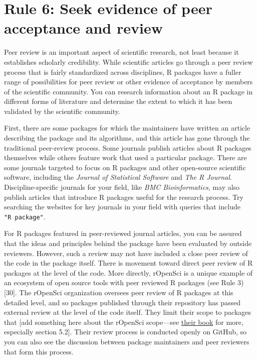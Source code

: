 \documentclass[10pt,letterpaper]{article}
\begin{document}
\hypertarget{rule-6-seek-evidence-of-peer-acceptance-and-review}{%
\section{Rule 6: Seek evidence of peer acceptance and
review}\label{rule-6-seek-evidence-of-peer-acceptance-and-review}}

Peer review is an important aspect of scientific research, not least
because it establishes scholarly credibility. While scientific articles
go through a peer review process that is fairly standardized across
disciplines, R packages have a fuller range of possibilities for peer
review or other evidence of acceptance by members of the scientific
community. You can research information about an R package in different
forms of literature and determine the extent to which it has been
validated by the scientific community.

First, there are some packages for which the maintainers have written an
article describing the package and its algorithms, and this article has
gone through the traditional peer-review process. Some journals publish
articles about R packages themselves while others feature work that used
a particular package. There are some journals targeted to focus on R
packages and other open-source scientific software, including the
\emph{Journal of Statistical Software} and \emph{The R Journal}.
Discipline-specific journals for your field, like \emph{BMC
Bioinformatics}, may also publish articles that introduce R packages
useful for the research process. Try searching the websites for key
journals in your field with queries that include \texttt{"R\ package"}.

For R packages featured in peer-reviewed journal articles, you can be
assured that the ideas and principles behind the package have been
evaluated by outside reviewers. However, such a review may not have
included a close peer review of the code in the package itself. There is
movement toward direct peer review of R packages at the level of the
code. More directly, rOpenSci is a unique example of an ecosystem of
open source tools with peer reviewed R packages (see Rule 3) {[}30{]}.
The rOpenSci organization oversees peer review of R packages at this
detailed level, and so packages published through their repository has
passed external review at the level of the code itself. They limit their
scope to packages that {[}add something here about the rOpenSci
scope---see \href{https://devguide.ropensci.org/}{their book} for more,
especially section 5.2{]}. Their review process is conducted openly on
GitHub, so you can also see the discussion between package maintainers
and peer reviewers that form this process.
\end{document}
